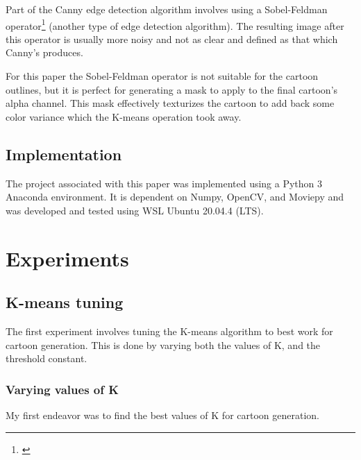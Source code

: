 \documentclass[11pt]{article}
\begin{document}
Part of the Canny edge detection algorithm involves using a Sobel-Feldman operator\footnote{\citep{Sobel2014}} (another type of edge detection algorithm).
The resulting image after this operator is usually more noisy and not as clear and defined as that which Canny's produces.

For this paper the Sobel-Feldman operator is not suitable for the cartoon outlines,
but it is perfect for generating a mask to apply to the final cartoon's alpha channel.
This mask effectively texturizes the cartoon to add back some color variance which the K-means operation took away.

\subsection{Implementation}

The project associated with this paper was implemented using a Python 3 Anaconda environment.
It is dependent on Numpy, OpenCV, and Moviepy and was developed and tested using WSL Ubuntu 20.04.4 (LTS).

\section{Experiments}

\subsection{K-means tuning}

The first experiment involves tuning the K-means algorithm to best work for cartoon generation.
This is done by varying both the values of K, and the threshold constant.

\subsubsection{Varying values of K}

My first endeavor was to find the best values of K for cartoon generation.
\end{document}
